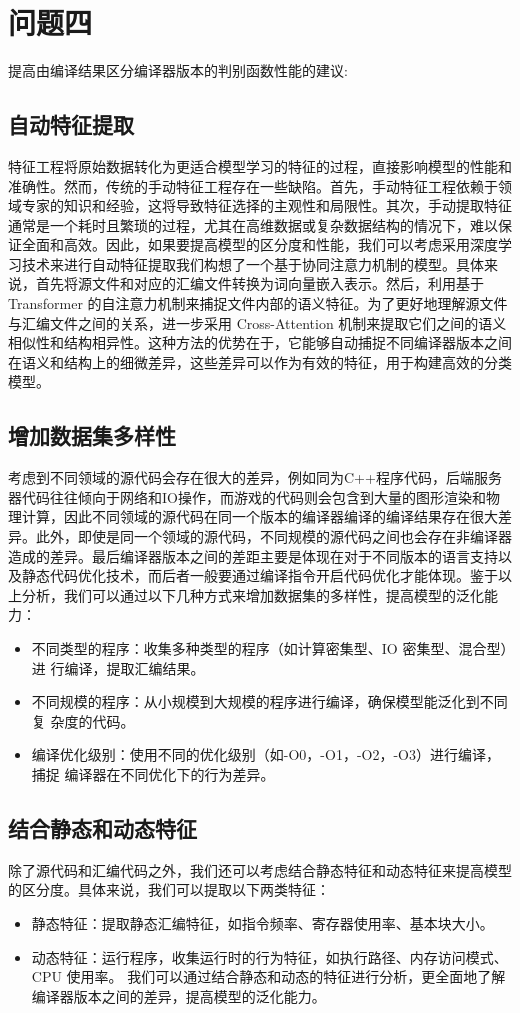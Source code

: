 \section{问题四}
提高由编译结果区分编译器版本的判别函数性能的建议:
\vspace*{1cm}
\subsection{自动特征提取}
特征工程将原始数据转化为更适合模型学习的特征的过程，直接影响模型的性能和准确性。然而，传统的手动特征工程存在一些缺陷。首先，手动特征工程依赖于领域专家的知识和经验，这将导致特征选择的主观性和局限性。其次，手动提取特征通常是一个耗时且繁琐的过程，尤其在高维数据或复杂数据结构的情况下，难以保证全面和高效。因此，如果要提高模型的区分度和性能，我们可以考虑采用深度学习技术来进行自动特征提取我们构想了一个基于协同注意力机制的模型。具体来说，首先将源文件和对应的汇编文件转换为词向量嵌入表示。然后，利用基于 Transformer 的自注意力机制来捕捉文件内部的语义特征。为了更好地理解源文件与汇编文件之间的关系，进一步采用 Cross-Attention 机制来提取它们之间的语义相似性和结构相异性。这种方法的优势在于，它能够自动捕捉不同编译器版本之间在语义和结构上的细微差异，这些差异可以作为有效的特征，用于构建高效的分类模型。
\vspace{1cm}
\subsection{增加数据集多样性}
考虑到不同领域的源代码会存在很大的差异，例如同为C++程序代码，后端服务器代码往往倾向于网络和IO操作，而游戏的代码则会包含到大量的图形渲染和物理计算，因此不同领域的源代码在同一个版本的编译器编译的编译结果存在很大差异。此外，即使是同一个领域的源代码，不同规模的源代码之间也会存在非编译器造成的差异。最后编译器版本之间的差距主要是体现在对于不同版本的语言支持以及静态代码优化技术，而后者一般要通过编译指令开启代码优化才能体现。鉴于以上分析，我们可以通过以下几种方式来增加数据集的多样性，提高模型的泛化能力：
\begin{itemize}
    \item 不同类型的程序：收集多种类型的程序（如计算密集型、IO 密集型、混合型）进
    行编译，提取汇编结果。
    \item 不同规模的程序：从小规模到大规模的程序进行编译，确保模型能泛化到不同复
    杂度的代码。
    \item 编译优化级别：使用不同的优化级别（如-O0，-O1，-O2，-O3）进行编译，捕捉
    编译器在不同优化下的行为差异。
\end{itemize}
\vspace*{1cm}
\subsection{结合静态和动态特征}
除了源代码和汇编代码之外，我们还可以考虑结合静态特征和动态特征来提高模型的区分度。具体来说，我们可以提取以下两类特征：
\begin{itemize}
    \item 静态特征：提取静态汇编特征，如指令频率、寄存器使用率、基本块大小。
    \item 动态特征：运行程序，收集运行时的行为特征，如执行路径、内存访问模式、CPU
    使用率。
 我们可以通过结合静态和动态的特征进行分析，更全面地了解编译器版本之间的差异，提高模型的泛化能力。
\end{itemize}